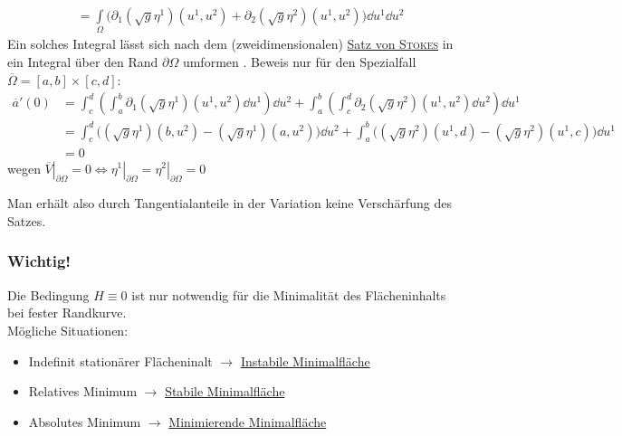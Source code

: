 \begin{beweis}
\begin{align*}
 &= \int\limits_\Omega \big( \partial_1(\sqrt{g} \eta^1)(u^1, u^2) + \partial_2(\sqrt{g}\eta^2)(u^1,u^2)\big) \dd u^1 \dd u^2
\end{align*}
Ein solches Integral lässt sich nach dem (zweidimensionalen) \uline{Satz von \textsc{Stokes}} in ein Integral über den Rand \(\partial \Omega\) umformen \mat{\left(\int\limits_\Omega \dd \varphi = \int\limits_{\partial\Omega} \varphi\right)}. Beweis nur für den Spezialfall \(\overline \Omega = [a, b] \times [c, d]\):
\begin{align*}
 \overline a'(0) &= \int_c^d \left(\int_a^b \partial_1 (\sqrt{g} \eta^1)(u^1, u^2) \dd u^1\right) \dd u^2 + \int_a^b \left(\int_c^d \partial_2 (\sqrt{g}\eta^2)(u^1, u^2) \dd u^2 \right) \dd u^1 \\
 &= \int_c^d \big( (\sqrt{g}\eta^1)(b, u^2) - (\sqrt{g}\eta^1)(a, u^2)\big)\dd u^2 + \int_a^b \big((\sqrt{g}\eta^2)(u^1, d) - (\sqrt{g}\eta^2)(u^1, c) \big) \dd u^1 \\
 &= 0
\end{align*}
wegen \(\left.\overline V\right|_{\partial \Omega} = 0 \Leftrightarrow \left. \eta^1 \right|_{\partial \Omega} = \left. \eta^2 \right|_{\partial \Omega} = 0\) \par
Man erhält also durch Tangentialanteile in der Variation keine Verschärfung des Satzes.
\end{beweis}

\subsubsection{Wichtig!}
Die Bedingung \(H \equiv 0\) ist nur notwendig für die Minimalität des Flächeninhalts bei fester Randkurve. \\
Mögliche Situationen:
\begin{itemize}
 \item Indefinit stationärer Flächeninalt \(\to\) \uline{Instabile Minimalfläche}
 \item Relatives Minimum \(\to\) \uline{Stabile Minimalfläche}
 \item Absolutes Minimum \(\to\) \uline{Minimierende Minimalfläche}
\end{itemize}

